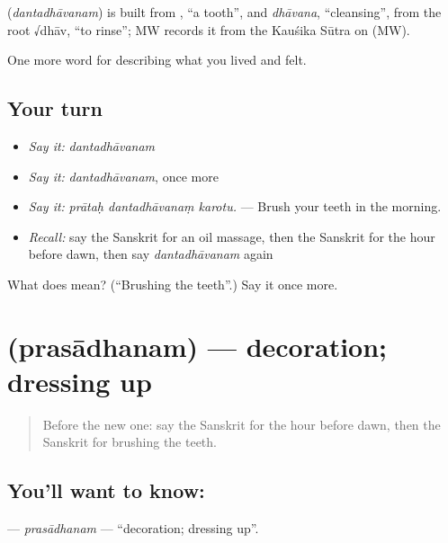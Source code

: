 \begin{cousinweb}
\textbf{} (\emph{dantadhāvanam}) is built from \textbf{}, \textquotedblleft{}a tooth\textquotedblright{}, and \emph{dhāvana}, \textquotedblleft{}cleansing\textquotedblright{}, from the root √dhāv, \textquotedblleft{}to rinse\textquotedblright{}; MW records it from the Kauśika Sūtra on (MW).
\end{cousinweb}

\begin{grammarlens}[title={What you've built}]
One more word for describing what you lived and felt.
\end{grammarlens}

\subsection*{Your turn}
\begin{itemize}
\raggedright
  \item \emph{Say it:} \emph{dantadhāvanam}
  \item \emph{Say it:} \emph{dantadhāvanam}, once more
  \item \emph{Say it:} \emph{prātaḥ dantadhāvanaṃ karotu.} — Brush your teeth in the morning.
  \item \emph{Recall:} say the Sanskrit for an oil massage, then the Sanskrit for the hour before dawn, then say \emph{dantadhāvanam} again
\end{itemize}

\begin{tcolorbox}[breakable,colback=teal!4,colframe=teal!35!black,title={Before you move on}]
What does  mean? (\textquotedblleft{}Brushing the teeth\textquotedblright{}.) Say it once more.
\end{tcolorbox}
\section[\texorpdfstring{\sk{प्रसाधनम्} (prasādhanam)}{प्रसाधनम् (prasādhanam)}]{ (prasādhanam) — decoration; dressing up}

\label{lesson:SA-C487-prasadhanam}



\begin{quote}
Before the new one: say the Sanskrit for the hour before dawn, then the Sanskrit for brushing the teeth.
\end{quote}

\subsection*{You'll want to know: }
\textbf{} — \emph{prasādhanam} — \textquotedblleft{}decoration; dressing up\textquotedblright{}.

